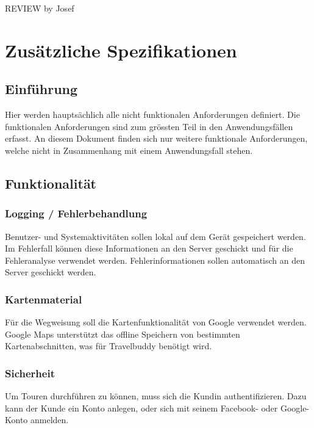\documentclass[ngerman,]{article}
\begin{document}
REVIEW by Josef

\section{Zusätzliche
Spezifikationen}\label{zusuxe4tzliche-spezifikationen}

\subsection{Einführung}\label{einfuxfchrung}

Hier werden hauptsächlich alle nicht funktionalen Anforderungen
definiert. Die funktionalen Anforderungen sind zum grössten Teil in den
Anwendungsfällen erfasst. An diesem Dokument finden sich nur weitere
funktionale Anforderungen, welche nicht in Zusammenhang mit einem
Anwendungsfall stehen.

\subsection{Funktionalität}\label{funktionalituxe4t}

\subsubsection{Logging /
Fehlerbehandlung}\label{logging-fehlerbehandlung}

Benutzer- und Systemaktivitäten sollen lokal auf dem Gerät gespeichert
werden. Im Fehlerfall können diese Informationen an den Server geschickt
und für die Fehleranalyse verwendet werden. Fehlerinformationen sollen
automatisch an den Server geschickt werden.

\subsubsection{Kartenmaterial}\label{kartenmaterial}

Für die Wegweisung soll die Kartenfunktionalität von Google verwendet
werden. Google Maps unterstützt das offline Speichern von bestimmten
Kartenabschnitten, was für Travelbuddy benötigt wird.

\subsubsection{Sicherheit}\label{sicherheit}

Um Touren durchführen zu können, muss sich die Kundin authentifizieren.
Dazu kann der Kunde ein Konto anlegen, oder sich mit seinem Facebook-
oder Google-Konto anmelden.
\end{document}
